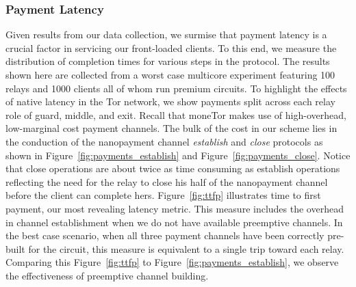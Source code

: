 \subsubsection{Payment Latency}

Given results from our data collection, we surmise that payment latency is a
crucial factor in servicing our front-loaded clients. To this end, we measure
the distribution of completion times for various steps in the protocol. The
results shown here are collected from a worst case multicore experiment
featuring 100 relays and 1000 clients all of whom run premium circuits. To
highlight the effects of native latency in the Tor network, we show payments
split across each relay role of guard, middle, and exit. Recall that moneTor
makes use of high-overhead, low-marginal cost payment channels. The bulk of the
cost in our scheme lies in the conduction of the nanopayment channel
\emph{establish} and \emph{close} protocols as shown in
Figure~\ref{fig:payments_establish} and Figure~\ref{fig:payments_close}. Notice
that close operations are about twice as time consuming as establish operations
reflecting the need for the relay to close his half of the nanopayment channel
before the client can complete hers. Figure~\ref{fig:ttfp} illustrates time to
first payment, our most revealing latency metric. This measure includes the
overhead in channel establishment when we do not have available preemptive
channels. In the best case scenario, when all three payment channels have been
correctly pre-built for the circuit, this measure is equivalent to a single trip
toward each relay. Comparing this Figure~\ref{fig:ttfp} to
Figure~\ref{fig:payments_establish}, we observe the effectiveness of preemptive
channel building.

